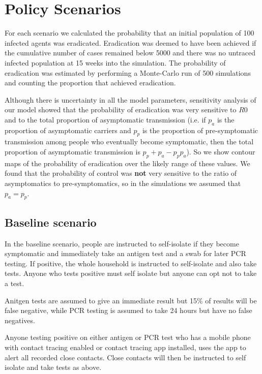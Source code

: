 \documentclass{article}
\begin{document}
\section{Policy Scenarios}

For each scenario we calculated the probability that an initial population of 100 infected agents was eradicated. Eradication was deemed to have been achieved if the cumulative number of cases remained below 5000 and there was no untraced infected population at 15 weeks into the simulation. The probability of eradication was estimated by performing a Monte-Carlo run of 500 simulations and counting the proportion that achieved eradication.

Although there is uncertainty in all the model parameters, sensitivity analysis of our model showed that the probability of eradication was very sensitive to $R0$ and to the total proportion of asymptomatic transmission (i.e. if $p_a$ is the proportion of asymptomatic carriers and $p_p$ is the proportion of pre-symptomatic transmission among people who eventually become symptomatic, then the total proportion of asymptomatic transmission is $p_p + p_a - p_pp_a$). So we show contour maps of the probability of eradication over the likely range of these values. We found that the probability of control was \textbf{not} very sensitive to the ratio of asymptomatics to pre-symptomatics, so in the simulations we assumed that $p_a = p_p$.

\subsection{Baseline scenario}

In the baseline scenario, people are instructed to self-isolate if they become symptomatic and immediately take an antigen test and a swab for later PCR testing. If positive, the whole household is instructed to self-isolate and also take tests. Anyone who tests positive must self isolate but anyone can opt not to take a test.

Anitgen tests are assumed to give an immediate result but 15\% of results will be false negative, while PCR testing is assumed to take 24 hours but have no false negatives.

Anyone testing positive on either antigen or PCR test who has a mobile phone with contact tracing enabled or contact tracing app installed, uses the app to alert all recorded close contacts. Close contacts will then be instructed to self isolate and take tests as above.
\end{document}
